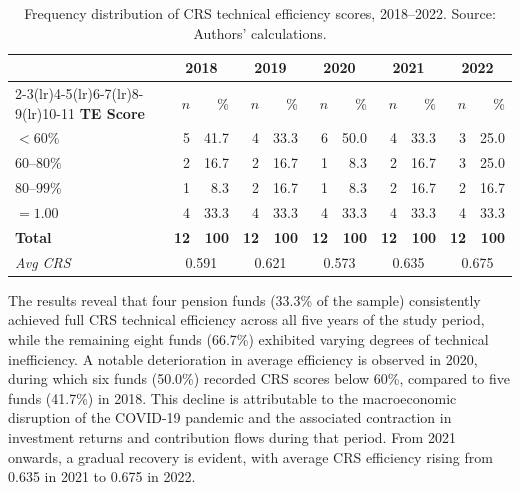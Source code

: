 \documentclass[12pt,a4paper]{article}
\begin{document}
\begin{table}[H]
\centering
\caption{Frequency distribution of CRS technical efficiency scores, 2018--2022. Source: Authors' calculations.}
\label{tab:crs_frequency}
\begin{tabular}{lrrrrrrrrrr}
\toprule
 & \multicolumn{2}{c}{\textbf{2018}} & \multicolumn{2}{c}{\textbf{2019}} & \multicolumn{2}{c}{\textbf{2020}} & \multicolumn{2}{c}{\textbf{2021}} & \multicolumn{2}{c}{\textbf{2022}} \\
\cmidrule(lr){2-3}\cmidrule(lr){4-5}\cmidrule(lr){6-7}\cmidrule(lr){8-9}\cmidrule(lr){10-11}
\textbf{TE Score} & $n$ & \% & $n$ & \% & $n$ & \% & $n$ & \% & $n$ & \% \\
\midrule
$< 60\%$      & 5 & 41.7 & 4 & 33.3 & 6 & 50.0 & 4 & 33.3 & 3 & 25.0 \\
$60$--$80\%$  & 2 & 16.7 & 2 & 16.7 & 1 &  8.3 & 2 & 16.7 & 3 & 25.0 \\
$80$--$99\%$  & 1 &  8.3 & 2 & 16.7 & 1 &  8.3 & 2 & 16.7 & 2 & 16.7 \\
$= 1.00$      & 4 & 33.3 & 4 & 33.3 & 4 & 33.3 & 4 & 33.3 & 4 & 33.3 \\
\midrule
\textbf{Total}    & \textbf{12} & \textbf{100} & \textbf{12} & \textbf{100} & \textbf{12} & \textbf{100} & \textbf{12} & \textbf{100} & \textbf{12} & \textbf{100} \\
\textit{Avg CRS}  & \multicolumn{2}{c}{0.591} & \multicolumn{2}{c}{0.621} & \multicolumn{2}{c}{0.573} & \multicolumn{2}{c}{0.635} & \multicolumn{2}{c}{0.675} \\
\bottomrule
\end{tabular}
\end{table}

The results reveal that four pension funds (33.3\% of the sample) consistently achieved full CRS technical efficiency across all five years of the study period, while the remaining eight funds (66.7\%) exhibited varying degrees of technical inefficiency. A notable deterioration in average efficiency is observed in 2020, during which six funds (50.0\%) recorded CRS scores below 60\%, compared to five funds (41.7\%) in 2018. This decline is attributable to the macroeconomic disruption of the COVID-19 pandemic and the associated contraction in investment returns and contribution flows during that period. From 2021 onwards, a gradual recovery is evident, with average CRS efficiency rising from 0.635 in 2021 to 0.675 in 2022.
\end{document}
